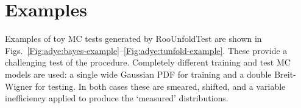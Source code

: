\documentclass{cernrep}
\begin{document}
\section{Examples\label{sec:adye:examples}}

Examples of toy MC tests generated by RooUnfoldTest
are shown in Figs.~\ref{Fig:adye:bayes-example}--\ref{Fig:adye:tunfold-example}.
These provide a challenging test of the procedure.
Completely different training and test MC models are used:
a single wide Gaussian PDF for training and a
double Breit-Wigner for testing. In both cases
these are smeared, shifted, and a variable inefficiency
applied to produce the `measured' distributions.%
\begin{figure}
\end{figure}
\end{document}
